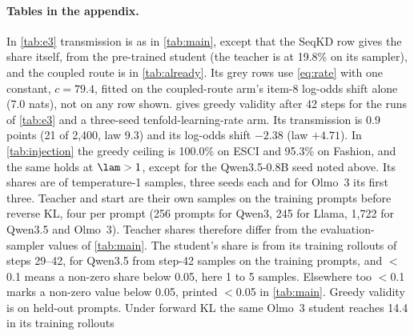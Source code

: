 \paragraph{Tables in the appendix.}
In \cref{tab:e3} transmission is as in \cref{tab:main}, except that the SeqKD row gives the share itself, from the pre-trained student (the teacher is at 19.8\% on its sampler), and the coupled route is in \cref{tab:already}. Its grey rows use \cref{eq:rate} with one constant, $c=79.4$, fitted on the coupled-route arm's item-8 log-odds shift alone (7.0 nats), not on any row shown.
 gives greedy validity after 42 steps for the runs of \cref{tab:e3} and a three-seed tenfold-learning-rate arm. Its transmission is 0.9 points (21 of 2,400, law 9.3) and its log-odds shift $-2.38$ (law $+4.71$).
In \cref{tab:injection} the greedy ceiling is 100.0\% on ESCI and 95.3\% on Fashion, and the same holds at $\lam>1$, except for the Qwen3.5-0.8B seed noted above.
Its shares are of temperature-1 samples, three seeds each and for Olmo~3 its first three. Teacher and start are their own samples on the training prompts before reverse KL, four per prompt (256 prompts for Qwen3, 245 for Llama, 1,722 for Qwen3.5 and Olmo~3). Teacher shares therefore differ from the evaluation-sampler values of \cref{tab:main}.
The student's share is from its training rollouts of steps 29--42, for Qwen3.5 from step-42 samples on the training prompts, and $<$0.1 means a non-zero share below 0.05, here 1 to 5 samples. Elsewhere too $<$0.1 marks a non-zero value below 0.05, printed $<$0.05 in \cref{tab:main}. Greedy validity is on held-out prompts. Under forward KL the same Olmo~3 student reaches 14.4 in its training rollouts



